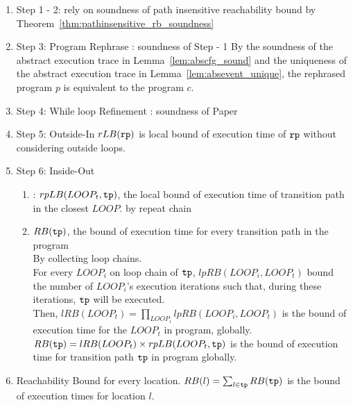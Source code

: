\begin{enumerate}
\item Step 1 - 2: rely on soundness of path insensitive reachability bound by Theorem~\ref{thm:pathinsensitive_rb_soundness}
\\
\item Step 3: Program Rephrase : soundness of Step - 1
By the soundness of the abstract execution trace in Lemma~\ref{lem:abscfg_sound}
and the uniqueness of the abstract execution trace in Lemma~\ref{lem:absevent_unique},
the rephrased program $p$ is equivalent to the program $c$.
\\
\item Step 4: While loop Refinement : soundness of Paper \cite{GulwaniJK09}
\\
\item Step 5: Outside-In 
$rLB(\mathtt{rp})$ is local bound of execution time of $\mathtt{rp}$ without considering outside loops.
\\
\item Step 6: Inside-Out
\begin{enumerate}
\item: $rpLB(LOOP_t, \mathtt{tp})$, the local bound of execution time of 
transition path in the closest $LOOP$.
by repeat chain 
\item $RB(\mathtt{tp})$, the bound of execution time for every transition path in the program
\\
By collecting loop chains.
\\
For every $LOOP_i$ on loop chain of $\mathtt{tp}$, $lpRB(LOOP_i, LOOP_t)$ bound 
the number of $LOOP_i$'s execution iterations
        such that, during these iterations, $\mathtt{tp}$ will be executed. 
\\
Then, $lRB(LOOP_t) = \prod\limits_{LOOP_i} lpRB(LOOP_i, LOOP_t)$ is the bound of execution time for the $LOOP_t$ in program, globally.
\\
$RB(\mathtt{tp}) = lRB(LOOP_t) \times rpLB(LOOP_t, \mathtt{tp}) $ is the bound of execution time for transition path $\mathtt{tp}$ 
in program globally.
\end{enumerate}
\item Reachability Bound for every location.
$RB(l) = \sum_{l \in \mathtt{tp}}RB(\mathtt{tp})$ is the bound of execution times for location $l$.

\end{enumerate}
